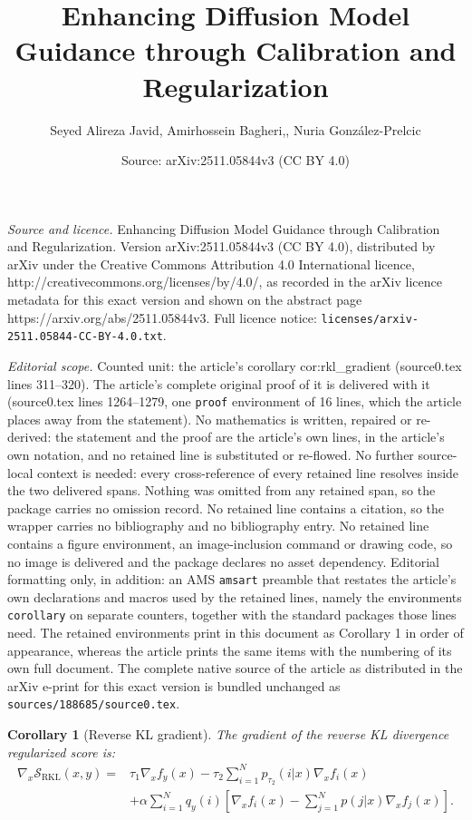 \documentclass[10pt,a4paper]{amsart}
\title{Enhancing Diffusion Model Guidance through Calibration and Regularization}
\author{Seyed Alireza Javid, Amirhossein Bagheri,, Nuria Gonz\'alez-Prelcic}
\date{Source: arXiv:2511.05844v3 (CC BY 4.0)}
\newtheorem{corollary}{Corollary}
\begin{document}
\maketitle

\noindent\emph{Source and licence.} Enhancing Diffusion Model Guidance through Calibration and Regularization. Version arXiv:2511.05844v3 (CC BY 4.0), distributed by arXiv under the Creative Commons Attribution 4.0 International licence, http://creativecommons.org/licenses/by/4.0/, as recorded in the arXiv licence metadata for this exact version and shown on the abstract page https://arxiv.org/abs/2511.05844v3. Full licence notice: \texttt{licenses/arxiv-2511.05844-CC-BY-4.0.txt}.\par\smallskip

\noindent\textit{Editorial scope.} Counted unit: the article's corollary cor:rkl\_gradient (source0.tex lines 311--320). The article's complete original proof of it is delivered with it (source0.tex lines 1264--1279, one \texttt{proof} environment of 16 lines, which the article places away from the statement). No mathematics is written, repaired or re-derived: the statement and the proof are the article's own lines, in the article's own notation, and no retained line is substituted or re-flowed.  No further source-local context is needed: every cross-reference of every retained line resolves inside the two delivered spans.  Nothing was omitted from any retained span, so the package carries no omission record.  No retained line contains a citation, so the wrapper carries no bibliography and no bibliography entry.  No retained line contains a figure environment, an image-inclusion command or drawing code, so no image is delivered and the package declares no asset dependency.  Editorial formatting only, in addition: an AMS \texttt{amsart} preamble that restates the article's own declarations and macros used by the retained lines, namely the environments \texttt{corollary} on separate counters, together with the standard packages those lines need.  The retained environments print in this document as Corollary 1 in order of appearance, whereas the article prints the same items with the numbering of its own full document.  The complete native source of the article as distributed in the arXiv e-print for this exact version is bundled unchanged as \texttt{sources/188685/source0.tex}.
\begin{corollary}[Reverse KL gradient]
\label{cor:rkl_gradient}
The gradient of the reverse KL divergence regularized score is:{\fontsize{8.5}{10}\selectfont
\begin{equation}
\begin{aligned}
\nabla_x \mathcal{S}_{\text{RKL}}(x, y) =& \tau_1 \nabla_x f_y(x) - \tau_2 \sum_{i=1}^N p_{\tau_2}(i|x) \nabla_x f_i(x) \\&+ \alpha \sum_{i=1}^N q_y(i) \left[\nabla_x f_i(x) - \sum_{j=1}^N p(j|x) \nabla_x f_j(x)\right].
\end{aligned}
\label{eq:rkl_gradient}
\end{equation}}
\end{corollary}
\end{document}
